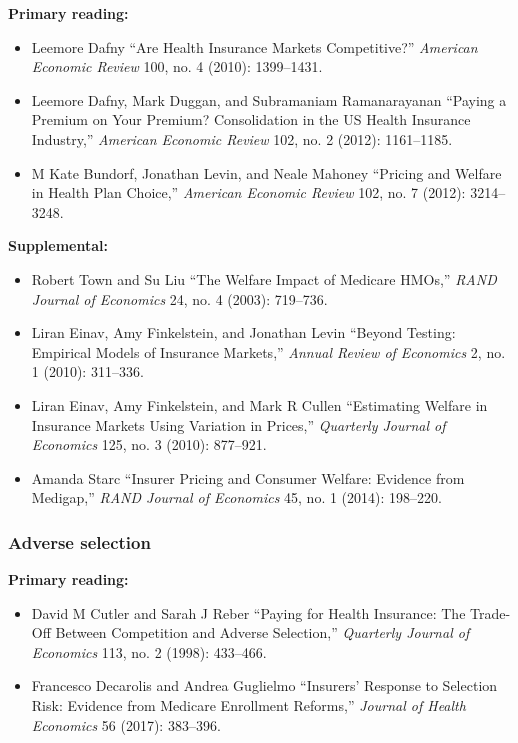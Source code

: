 \documentclass[11pt,]{article}
\providecommand{\tightlist}{%
  \setlength{\itemsep}{0pt}\setlength{\parskip}{0pt}}
\begin{document}
\textbf{Primary reading:}

\begin{itemize}
\tightlist
\item
  Leemore Dafny {``Are {Health} {Insurance} {Markets} {Competitive}?''}
  \emph{American Economic Review} 100, no. 4 (2010): 1399--1431.
\item
  Leemore Dafny, Mark Duggan, and Subramaniam Ramanarayanan {``Paying a
  {Premium} on {Your} {Premium}? {Consolidation} in the {US} {Health}
  {Insurance} {Industry},''} \emph{American Economic Review} 102, no. 2
  (2012): 1161--1185.
\item
  M Kate Bundorf, Jonathan Levin, and Neale Mahoney {``Pricing and
  Welfare in Health Plan Choice,''} \emph{American Economic Review} 102,
  no. 7 (2012): 3214--3248.
\end{itemize}

\textbf{Supplemental:}

\begin{itemize}
\tightlist
\item
  Robert Town and Su Liu {``The Welfare Impact of {Medicare} {HMOs},''}
  \emph{RAND Journal of Economics} 24, no. 4 (2003): 719--736.
\item
  Liran Einav, Amy Finkelstein, and Jonathan Levin {``Beyond {Testing}:
  {Empirical} {Models} of {Insurance} {Markets},''} \emph{Annual Review
  of Economics} 2, no. 1 (2010): 311--336.
\item
  Liran Einav, Amy Finkelstein, and Mark R Cullen {``Estimating
  {Welfare} in {Insurance} {Markets} {Using} {Variation} in {Prices},''}
  \emph{Quarterly Journal of Economics} 125, no. 3 (2010): 877--921.
\item
  Amanda Starc {``Insurer Pricing and Consumer Welfare: {Evidence} from
  Medigap,''} \emph{RAND Journal of Economics} 45, no. 1 (2014):
  198--220.
\end{itemize}

\hypertarget{adverse-selection}{%
\subsubsection{Adverse selection}\label{adverse-selection}}

\textbf{Primary reading:}

\begin{itemize}
\tightlist
\item
  David M Cutler and Sarah J Reber {``Paying for {Health} {Insurance}:
  {The} {Trade}-{Off} Between {Competition} and {Adverse}
  {Selection},''} \emph{Quarterly Journal of Economics} 113, no. 2
  (1998): 433--466.
\item
  Francesco Decarolis and Andrea Guglielmo {``Insurers' Response to
  Selection Risk: {Evidence} from {Medicare} Enrollment Reforms,''}
  \emph{Journal of Health Economics} 56 (2017): 383--396.
\end{itemize}
\end{document}
